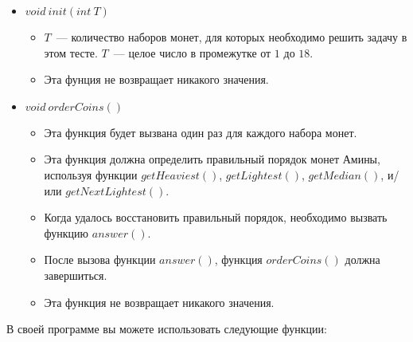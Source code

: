 \begin{itemize}
\item $void\ init(int\ T)$
\begin{itemize}
\item $T$~--- количество наборов монет, для которых необходимо решить задачу в этом
тесте. $T$~--- целое число в промежутке от $1$ до $18$.
\item Эта фунция не возвращает никакого значения.
\end{itemize}
\item $void\ orderCoins()$
\begin{itemize}
\item Эта функция будет вызвана один раз для каждого набора монет.
\item Эта функция должна определить правильный порядок монет Амины, используя
функции $getHeaviest()$, $getLightest()$, $getMedian()$, и/или
$getNextLightest()$.
\item Когда удалось восстановить правильный порядок, необходимо вызвать функцию
$answer()$.
\item После вызова функции $answer()$, функция $orderCoins()$ должна завершиться.
\item Эта функция не возвращает никакого значения.
\end{itemize}
\end{itemize}



В своей программе вы можете использовать следующие функции:

